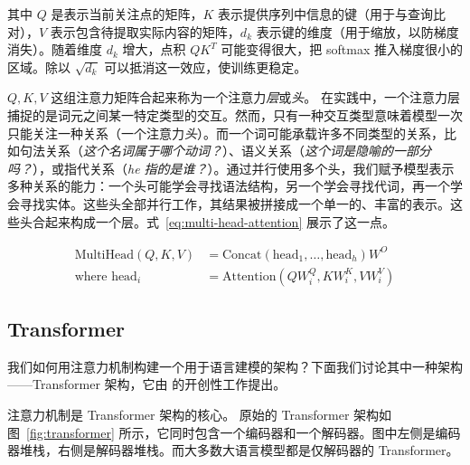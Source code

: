 其中 $Q$ 是表示当前关注点的矩阵，$K$ 表示提供序列中信息的键（用于与查询比对），$V$ 表示包含待提取实际内容的矩阵，$d_k$ 表示键的维度（用于缩放，以防梯度消失）。随着维度 $d_k$ 增大，点积 $QK^T$ 可能变得很大，把 softmax 推入梯度很小的区域。除以 $\sqrt{d_k}$ 可以抵消这一效应，使训练更稳定。

$Q,K,V$ 这组注意力矩阵合起来称为一个注意力{\em 层}或{\em 头}。
在实践中，一个注意力层捕捉的是词元之间某一特定类型的交互。然而，只有一种交互类型意味着模型一次只能关注一种关系（一个注意力{\em 头}）。而一个词可能承载许多不同类型的关系，比如句法关系（{\em 这个名词属于哪个动词？}）、语义关系（{\em 这个词是隐喻的一部分吗？}），或指代关系（{\em he 指的是谁？}）。通过并行使用多个头，我们赋予模型表示多种关系的能力：一个头可能学会寻找语法结构，另一个学会寻找代词，再一个学会寻找实体。这些头全部并行工作，其结果被拼接成一个单一的、丰富的表示。这些头合起来构成一个层。式~\ref{eq:multi-head-attention} 展示了这一点。


\begin{align}
    \label{eq:multi-head-attention}
    \text{MultiHead}(Q, K, V) &= \text{Concat}(\text{head}_1, \dots, \text{head}_h)W^O \\
    \nonumber \text{where } \text{head}_i &= \text{Attention}(QW_i^Q, KW_i^K, VW_i^V)    
\end{align}


\subsection{Transformer}
我们如何用注意力机制构建一个用于语言建模的架构？下面我们讨论其中一种架构——Transformer 架构，它由 \citet{vaswani2017attention} 的开创性工作提出。

注意力机制是 Transformer 架构的核心。
%
原始的 Transformer 架构如图~\ref{fig:transformer} 所示，它同时包含一个编码器和一个解码器。图中左侧是编码器堆栈，右侧是解码器堆栈。而大多数大语言模型都是仅解码器的 Transformer。

